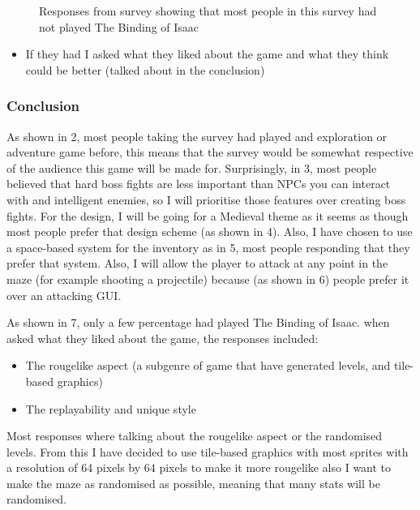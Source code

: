\documentclass[../Main.tex]{subfiles}
\begin{document}
\begin{itemize}
\begin{figure}[hbt!]
                    \caption{Responses from survey showing that most people in this survey had not played The Binding of Isaac}
                    \label{fig}
                \end{figure}
                \begin{itemize}
                    \item If they had I asked what they liked about the game and what they think could be better (talked about in the conclusion)
                \end{itemize}
            \end{itemize}
    \subsubsection{Conclusion}
        As shown in \figurename{ 2}, most people taking the survey had played and exploration or adventure game before, this means that the survey would be somewhat respective of the audience this game will be made for. Surprisingly, in \figurename{ 3}, most people believed that hard boss fights are less important than NPCs you can interact with and intelligent enemies, so I will prioritise those features over creating boss fights. For the design, I will be going for a Medieval theme as it seems as though most people prefer that design scheme (as shown in \figurename{ 4}). Also, I have chosen to use a space-based system for the inventory as in \figurename{ 5}, most people responding that they prefer that system. Also, I will allow the player to attack at any point in the maze (for example shooting a projectile) because (as shown in \figurename{ 6}) people prefer it over an attacking GUI.

        As shown in \figurename{ 7}, only a few percentage had played The Binding of Isaac. when asked what they liked about the game, the responses included:
        \begin{itemize}
            \item The rougelike aspect (a subgenre of game that have generated levels, and tile-based graphics)
            \item The replayability and unique style
        \end{itemize}
        Most responses where talking about the rougelike aspect or the randomised levels. From this I have decided to use tile-based graphics with most sprites with a resolution of 64 pixels by 64 pixels to make it more rougelike also I want to make the maze as randomised as possible, meaning that many stats will be randomised.
\end{document}
